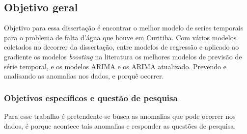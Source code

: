 \subsection{Objetivo geral} \label{subsec:objetivos}

 
Objetivo para essa dissertação é encontrar o melhor modelo de series temporais para o problema de falta d'água que houve em Curitiba. Com vários modelos coletados no decorrer da dissertação, entre modelos de regressão e aplicado ao gradiente os modelos \textit{boosting} na literatura os melhores modelos de previsão de série temporal, e os modelos ARIMA e os ARIMA atualizado. Prevendo e analisando as anomalias nos dados, e porquê ocorrer.
    
    
    \subsubsection{Objetivos espec\'ificos e quest\~ao de pesquisa} \label{subsubsec:obespec}
    
Para esse trabalho é pretendente-se busca as anomalias que pode ocorrer nos dados, é porque acontece tais anomalias e responder as questões de pesquisa.

